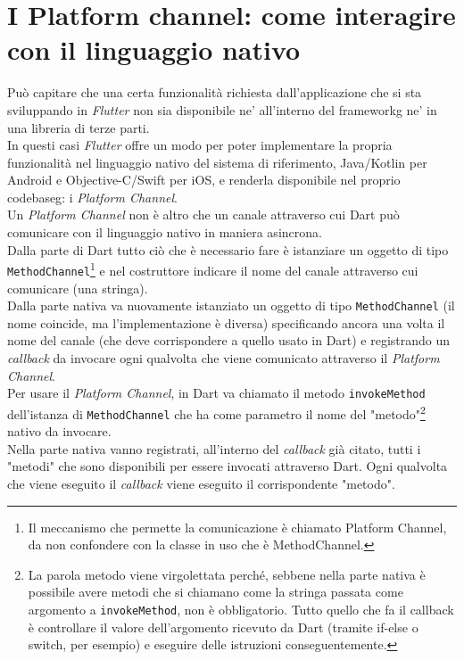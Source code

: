 \section{I Platform channel: come interagire con il linguaggio nativo}
\label{sec:platform-channel}
Può capitare che una certa funzionalità richiesta dall'applicazione che si sta sviluppando in \emph{Flutter} non sia disponibile ne' all'interno del \gls{frameworkg} ne' in una libreria di terze parti.\\
In questi casi \emph{Flutter} offre un modo per poter implementare la propria funzionalità nel linguaggio nativo del sistema di riferimento, Java/Kotlin per Android e Objective-C/Swift per iOS, e renderla disponibile nel proprio \gls{codebaseg}: i \emph{Platform Channel}.\\
Un \emph{Platform Channel} non è altro che un canale attraverso cui Dart può comunicare con il linguaggio nativo in maniera asincrona.\\
Dalla parte di Dart tutto ciò che è necessario fare è istanziare un oggetto di tipo \texttt{MethodChannel}\footnote{Il meccanismo che permette la comunicazione è chiamato Platform Channel, da non confondere con la classe in uso che è MethodChannel.} e nel costruttore indicare il nome del canale attraverso cui comunicare (una stringa).\\
Dalla parte nativa va nuovamente istanziato un oggetto di tipo \texttt{MethodChannel} (il nome coincide, ma l'implementazione è diversa) specificando ancora una volta il nome del canale (che deve corrispondere a quello usato in Dart) e registrando un \emph{callback} da invocare ogni qualvolta che viene comunicato attraverso il \emph{Platform Channel}.\\
Per usare il \emph{Platform Channel}, in Dart va chiamato il metodo \texttt{invokeMethod} dell'istanza di \texttt{MethodChannel} che ha come parametro il nome del "metodo"\footnote{La parola metodo viene virgolettata perché, sebbene nella parte nativa è possibile avere metodi che si chiamano come la stringa passata come argomento a \texttt{invokeMethod}, non è obbligatorio. Tutto quello che fa il callback è controllare il valore dell'argomento ricevuto da Dart (tramite if-else o switch, per esempio) e eseguire delle istruzioni conseguentemente.} nativo da invocare.\\
Nella parte nativa vanno registrati, all'interno del \emph{callback} già citato, tutti i "metodi" che sono disponibili per essere invocati attraverso Dart.
Ogni qualvolta che viene eseguito il \emph{callback} viene eseguito il corrispondente "metodo".